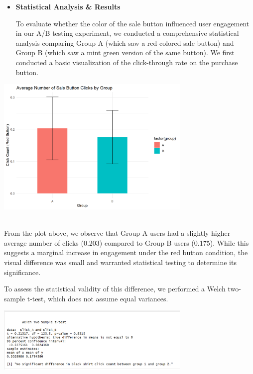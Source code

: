 \documentclass[
  letterpaper,
  DIV=11,
  numbers=noendperiod]{scrartcl}
\begin{document}
\begin{itemize}
\item
  \textbf{Statistical Analysis \& Results}

  To evaluate whether the color of the sale button influenced user
  engagement in our A/B testing experiment, we conducted a comprehensive
  statistical analysis comparing Group A (which saw a red-colored sale
  button) and Group B (which saw a mint green version of the same
  button). We first conducted a basic visualization of the click-through
  rate on the purchase button.\\
\end{itemize}

\begin{center}
\includegraphics[width=0.7\textwidth,height=\textheight]{data_ana_pj3_files/figure-html/unnamed-chunk-3-1.png}
\end{center}
\\

From the plot above, we observe that Group A users had a slightly higher
average number of clicks (0.203) compared to Group B users (0.175).
While this suggests a marginal increase in engagement under the red
button condition, the visual difference was small and warranted
statistical testing to determine its significance.

To assess the statistical validity of this difference, we performed a
Welch two-sample t-test, which does not assume equal variances.\\

\begin{center}
\includegraphics[width=0.7\textwidth,height=\textheight]{data_ana_pj3_files/t_test_result.png}
\end{center}
\\
\end{document}
